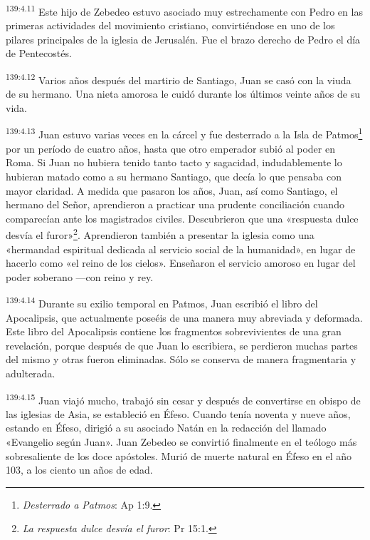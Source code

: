 \par 
\textsuperscript{139:4.11} Este hijo de Zebedeo estuvo asociado muy estrechamente con Pedro en las primeras actividades del movimiento cristiano, convirtiéndose en uno de los pilares principales de la iglesia de Jerusalén. Fue el brazo derecho de Pedro el día de Pentecostés.

\par 
\textsuperscript{139:4.12} Varios años después del martirio de Santiago, Juan se casó con la viuda de su hermano. Una nieta amorosa le cuidó durante los últimos veinte años de su vida.

\par 
\textsuperscript{139:4.13} Juan estuvo varias veces en la cárcel y fue desterrado a la Isla de Patmos\footnote{\textit{Desterrado a Patmos}: Ap 1:9.} por un período de cuatro años, hasta que otro emperador subió al poder en Roma. Si Juan no hubiera tenido tanto tacto y sagacidad, indudablemente lo hubieran matado como a su hermano Santiago, que decía lo que pensaba con mayor claridad. A medida que pasaron los años, Juan, así como Santiago, el hermano del Señor, aprendieron a practicar una prudente conciliación cuando comparecían ante los magistrados civiles. Descubrieron que una «respuesta dulce desvía el furor»\footnote{\textit{La respuesta dulce desvía el furor}: Pr 15:1.}. Aprendieron también a presentar la iglesia como una «hermandad espiritual dedicada al servicio social de la humanidad», en lugar de hacerlo como «el reino de los cielos». Enseñaron el servicio amoroso en lugar del poder soberano ---con reino y rey.

\par 
\textsuperscript{139:4.14} Durante su exilio temporal en Patmos, Juan escribió el libro del Apocalipsis, que actualmente poseéis de una manera muy abreviada y deformada. Este libro del Apocalipsis contiene los fragmentos sobrevivientes de una gran revelación, porque después de que Juan lo escribiera, se perdieron muchas partes del mismo y otras fueron eliminadas. Sólo se conserva de manera fragmentaria y adulterada.

\par 
\textsuperscript{139:4.15} Juan viajó mucho, trabajó sin cesar y después de convertirse en obispo de las iglesias de Asia, se estableció en Éfeso. Cuando tenía noventa y nueve años, estando en Éfeso, dirigió a su asociado Natán en la redacción del llamado «Evangelio según Juan». Juan Zebedeo se convirtió finalmente en el teólogo más sobresaliente de los doce apóstoles. Murió de muerte natural en Éfeso en el año 103, a los ciento un años de edad.

